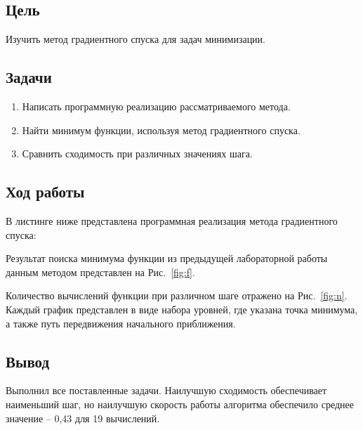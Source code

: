 


    
\newcommand{\labn}{6}


\subsection*{Цель}

Изучить метод градиентного спуска для задач минимизации.

\subsection*{Задачи}

\begin{enumerate}
    \item Написать программную реализацию рассматриваемого метода.
    \item Найти минимум функции, используя метод градиентного спуска.
    \item Сравнить сходимость при различных значениях шага.
\end{enumerate}

\subsection*{Ход работы}

В листинге ниже представлена программная реализация метода градиентного спуска:

Результат поиска минимума функции из предыдущей лабораторной работы данным методом представлен на Рис.~\ref{fig:f}.

Количество вычислений функции при различном шаге отражено на Рис.~\ref{fig:n}. 
Каждый график представлен в виде набора уровней, где указана точка минимума, а также путь передвижения начального приближения.

\subsection*{Вывод}

Выполнил все поставленные задачи. 
Наилучшую сходимость обеспечивает наименьший шаг, но наилучшую скорость работы алгоритма обеспечило среднее значение -- 0,43 для 19 вычислений.


